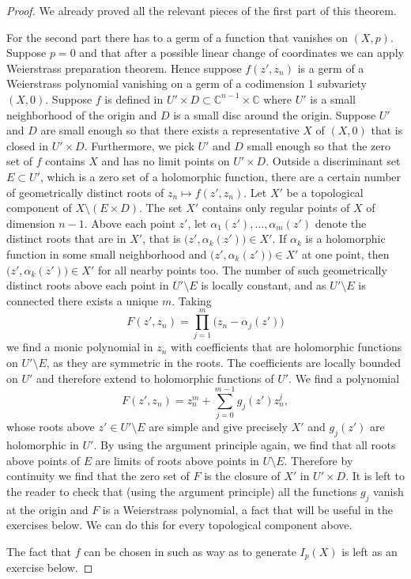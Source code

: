 \documentclass[12pt,openany]{book}
\newcommand{\C}{{\mathbb{C}}}
\theoremstyle{plain}
\theoremstyle{remark}
\theoremstyle{definition}
\theoremstyle{exercise}
\theoremstyle{example}
\begin{document}
\begin{proof}
We already proved all the relevant pieces of the first part of this
theorem.

For the second part there has to a germ of a function that vanishes on
$(X,p)$.  Suppose $p=0$ and that after a possible linear
change of coordinates we can apply Weierstrass preparation theorem.  Hence
suppose $f(z',z_n)$ is a germ of a Weierstrass
polynomial vanishing on a germ of a codimension 1 subvariety $(X,0)$.
Suppose $f$ is defined in $U' \times D \subset \C^{n-1} \times \C$ where $U'$ is a small neighborhood
of the origin and $D$ is a small disc around the origin.
Suppose $U'$ and $D$ are small enough so that there exists a 
representative $X$ of $(X,0)$ that is closed in $U' \times D$.
Furthermore, we pick $U'$ and $D$ small enough so that the zero set of $f$
contains $X$ and has no limit points on $U' \times D$.
Outside a discriminant set $E \subset U'$, which is a zero set of a
holomorphic function, there are a certain number of geometrically
distinct roots of $z_n \mapsto f(z',z_n)$.  Let $X'$ be a topological component of $X \setminus ( E
\times D )$.  The set $X'$ contains only regular points of $X$ of
dimension $n-1$.
Above each point $z'$, let 
$\alpha_1(z'),\ldots,\alpha_m(z')$ denote the distinct roots that are in $X'$,
that is $\bigl(z',\alpha_k(z')\bigr) \in X'$.
If $\alpha_k$ is a holomorphic function in some small neighborhood and
$\bigl(z',\alpha_k(z')\bigr) \in X'$ at one point, then 
$\bigl(z',\alpha_k(z')\bigr) \in X'$ for all nearby points too.
The number of
such geometrically distinct roots above each point in
$U' \setminus E$ is locally constant, and as $U' \setminus E$ is connected
there exists a unique $m$.  Taking
\begin{equation*}
F(z',z_n) = \prod_{j=1}^m \bigl( z_n-\alpha_j(z')\bigr)
\end{equation*}
we find a monic polynomial in $z_n$ with coefficients that are holomorphic
functions on $U' \setminus E$, as they are symmetric in the roots.
The coefficients are locally bounded
on $U'$ and therefore extend to holomorphic functions of $U'$.  We find
a polynomial
\begin{equation*}
F(z',z_n) = z_n^m + \sum_{j=0}^{m-1} g_j(z') z_n^j ,
\end{equation*}
whose roots
above $z' \in U' \setminus E$
are simple and give precisely $X'$
and $g_j(z')$ are holomorphic in $U'$. 
  By using the argument principle
again, we find that all roots above points of $E$ are limits of roots
above points in $U \setminus E$.
Therefore by continuity we find that
the zero set of $F$ is the closure of $X'$ in $U' \times D$.
It is left to the reader to check that (using the argument principle)
all the functions $g_j$ vanish at the origin and $F$ is a Weierstrass
polynomial, a fact that will be useful in the exercises below.
We can do this for every topological component above.

The fact that $f$ can be chosen in such as way as to generate $I_p(X)$
is left as an exercise below.
\end{proof}
\end{document}
